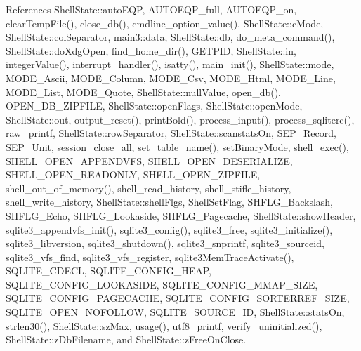 References Shell\+State\+::auto\+E\+QP, A\+U\+T\+O\+E\+Q\+P\+\_\+full, A\+U\+T\+O\+E\+Q\+P\+\_\+on, clear\+Temp\+File(), close\+\_\+db(), cmdline\+\_\+option\+\_\+value(), Shell\+State\+::c\+Mode, Shell\+State\+::col\+Separator, main3\+::data, Shell\+State\+::db, do\+\_\+meta\+\_\+command(), Shell\+State\+::do\+Xdg\+Open, find\+\_\+home\+\_\+dir(), G\+E\+T\+P\+ID, Shell\+State\+::in, integer\+Value(), interrupt\+\_\+handler(), isatty(), main\+\_\+init(), Shell\+State\+::mode, M\+O\+D\+E\+\_\+\+Ascii, M\+O\+D\+E\+\_\+\+Column, M\+O\+D\+E\+\_\+\+Csv, M\+O\+D\+E\+\_\+\+Html, M\+O\+D\+E\+\_\+\+Line, M\+O\+D\+E\+\_\+\+List, M\+O\+D\+E\+\_\+\+Quote, Shell\+State\+::null\+Value, open\+\_\+db(), O\+P\+E\+N\+\_\+\+D\+B\+\_\+\+Z\+I\+P\+F\+I\+LE, Shell\+State\+::open\+Flags, Shell\+State\+::open\+Mode, Shell\+State\+::out, output\+\_\+reset(), print\+Bold(), process\+\_\+input(), process\+\_\+sqliterc(), raw\+\_\+printf, Shell\+State\+::row\+Separator, Shell\+State\+::scanstats\+On, S\+E\+P\+\_\+\+Record, S\+E\+P\+\_\+\+Unit, session\+\_\+close\+\_\+all, set\+\_\+table\+\_\+name(), set\+Binary\+Mode, shell\+\_\+exec(), S\+H\+E\+L\+L\+\_\+\+O\+P\+E\+N\+\_\+\+A\+P\+P\+E\+N\+D\+V\+FS, S\+H\+E\+L\+L\+\_\+\+O\+P\+E\+N\+\_\+\+D\+E\+S\+E\+R\+I\+A\+L\+I\+ZE, S\+H\+E\+L\+L\+\_\+\+O\+P\+E\+N\+\_\+\+R\+E\+A\+D\+O\+N\+LY, S\+H\+E\+L\+L\+\_\+\+O\+P\+E\+N\+\_\+\+Z\+I\+P\+F\+I\+LE, shell\+\_\+out\+\_\+of\+\_\+memory(), shell\+\_\+read\+\_\+history, shell\+\_\+stifle\+\_\+history, shell\+\_\+write\+\_\+history, Shell\+State\+::shell\+Flgs, Shell\+Set\+Flag, S\+H\+F\+L\+G\+\_\+\+Backslash, S\+H\+F\+L\+G\+\_\+\+Echo, S\+H\+F\+L\+G\+\_\+\+Lookaside, S\+H\+F\+L\+G\+\_\+\+Pagecache, Shell\+State\+::show\+Header, sqlite3\+\_\+appendvfs\+\_\+init(), sqlite3\+\_\+config(), sqlite3\+\_\+free, sqlite3\+\_\+initialize(), sqlite3\+\_\+libversion, sqlite3\+\_\+shutdown(), sqlite3\+\_\+snprintf, sqlite3\+\_\+sourceid, sqlite3\+\_\+vfs\+\_\+find, sqlite3\+\_\+vfs\+\_\+register, sqlite3\+Mem\+Trace\+Activate(), S\+Q\+L\+I\+T\+E\+\_\+\+C\+D\+E\+CL, S\+Q\+L\+I\+T\+E\+\_\+\+C\+O\+N\+F\+I\+G\+\_\+\+H\+E\+AP, S\+Q\+L\+I\+T\+E\+\_\+\+C\+O\+N\+F\+I\+G\+\_\+\+L\+O\+O\+K\+A\+S\+I\+DE, S\+Q\+L\+I\+T\+E\+\_\+\+C\+O\+N\+F\+I\+G\+\_\+\+M\+M\+A\+P\+\_\+\+S\+I\+ZE, S\+Q\+L\+I\+T\+E\+\_\+\+C\+O\+N\+F\+I\+G\+\_\+\+P\+A\+G\+E\+C\+A\+C\+HE, S\+Q\+L\+I\+T\+E\+\_\+\+C\+O\+N\+F\+I\+G\+\_\+\+S\+O\+R\+T\+E\+R\+R\+E\+F\+\_\+\+S\+I\+ZE, S\+Q\+L\+I\+T\+E\+\_\+\+O\+P\+E\+N\+\_\+\+N\+O\+F\+O\+L\+L\+OW, S\+Q\+L\+I\+T\+E\+\_\+\+S\+O\+U\+R\+C\+E\+\_\+\+ID, Shell\+State\+::stats\+On, strlen30(), Shell\+State\+::sz\+Max, usage(), utf8\+\_\+printf, verify\+\_\+uninitialized(), Shell\+State\+::z\+Db\+Filename, and Shell\+State\+::z\+Free\+On\+Close.


